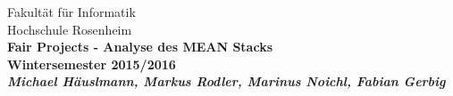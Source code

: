 
\newcommand{\titel}{Fair Projects - Analyse des MEAN Stacks\\
\Large Wintersemester 2015/2016}
\newcommand{\verfasser}{Michael Häuslmann, Markus Rodler, Marinus Noichl, Fabian Gerbig}


\hspace{10mm}\parbox{390pt}{
  
  \sloppy
  \setlength{\parskip}{0.3\baselineskip}
  \pagestyle{empty}
  
  \begin{center}
    \LARGE
    Fakultät für Informatik\\
    Hochschule Rosenheim\\[50mm]
    \LARGE \bf \renewcommand{\baselinestretch}{1.3}
    \titel\\[25mm]
    \Large \em
    \verfasser
  \end{center}
}
  
